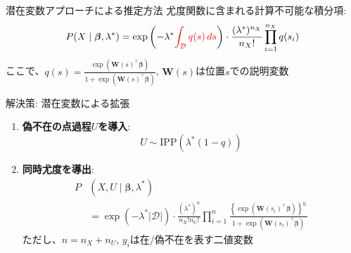 \documentclass[xelatex, 8pt]{beamer}
\theoremstyle{plain}
\theoremstyle{definition}
\begin{document}
\begin{frame}{潜在変数アプローチによる推定方法}
    尤度関数に含まれる計算不可能な積分項:
    $$
    P(X \mid \boldsymbol{\beta}, \lambda^*) = \exp\left( -\lambda^* \textcolor{red}{\int_{\mathcal{D}} q(s) \, ds} \right) \cdot \frac{(\lambda^*)^{n_X}}{n_X!} \prod_{i=1}^{n_X} q(s_i)
    $$
    ここで、$q(s) = \frac{\exp(\boldsymbol{W}(s)^\top \boldsymbol{\beta})}{1 + \exp(\boldsymbol{W}(s)^\top \boldsymbol{\beta})}$, $\boldsymbol{W}(s)$は位置$s$での説明変数

    \vspace{2mm}
    解決策: 潜在変数による拡張
    \begin{enumerate}
        \item \textbf{偽不在の点過程$U$を導入}:
        $$
        U \sim \text{IPP}(\lambda^*(1-q))
        $$

        \item \textbf{同時尤度を導出}:
        \begin{align*}
        P&(X, U \mid \boldsymbol{\beta}, \lambda^*) \\
        &= \exp \left( - \lambda^* |\mathcal{D}| \right) \cdot \frac{(\lambda^*)^{n}}{n_X!n_U!} \prod_{i=1}^{n} \frac{\left\{\exp\left( \boldsymbol{W}(s_i)^\top \boldsymbol{\beta} \right)\right\}^{y_i}}{1 + \exp\left(\boldsymbol{W}(s_i)^\top \boldsymbol{\beta}\right)}
        \end{align*}
        ただし、$n = n_X + n_U$, $y_i$は在/偽不在を表す二値変数
    \end{enumerate}
\end{frame}
\end{document}
